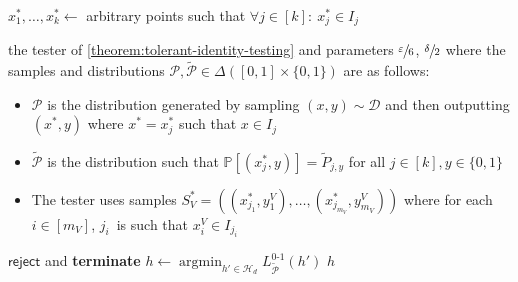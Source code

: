 \documentclass[11pt]{article}
\numberwithin{equation}{section}
\theoremstyle{definition}
\theoremstyle{plain}
\theoremstyle{definition}\newtheorem{notation}[theorem]{Notation}\theoremstyle{plain}\raggedbottom
\newcommand{\roundBrackets}[1]{
	\mathopen{}\left(#1\right)\mathclose{}
}
\newcommand{\squareBrackets}[1]{
	\mathopen{}\left[#1\right]\mathclose{}
}
\newcommand{\customFunctionSquare}[2]{
	#1\squareBrackets{#2}
}
\newcommand{\bbFunction}[2]{
	\customFunctionSquare{\mathbb{#1}}{#2}
}
\newcommand{\vsp}{\vspace{0.5em}}
\newcommand{\vspp}{\vspace{1em}}
\newcommand{\argmin}{\operatorname{argmin}}
\newcommand{\PP}[1]{\bbFunction{P}{#1}}
\newcommand{\LossIndicator}[2]{\LossIndicatorNameEmpty_{#1}\roundBrackets{#2}}
\newcommand{\LossIndicatorNameEmpty}{L^{0\text{-}1}}
\newcommand{\reject}{\mathsf{reject}}
\newcommand{\cD}{\mathcal{D}}
\newcommand{\cH}{\mathcal{H}}
\newcommand{\cP}{\mathcal{P}}
\newcommand{\1}{\mathds{1}}
\newcommand{\mV}{m_{\scriptscriptstyle V}}
\newenvironment{ShadedAlgorithmBox}{\begin{tcolorbox}[colback=myLipicsLightGray,colframe=myLipicsLightGray,arc=-1pt]\begin{minipage}{0.975\textwidth}}{\end{minipage}\end{tcolorbox}}
\begin{document}
\begin{minipage}{\textwidth}
\begin{protocol}[H]
\begin{ShadedAlgorithmBox}
\begin{algorithmic}
			\vsp

			\State $x_1^*,\dots,x_k^* \gets$ arbitrary points such that $\forall j \in [k]: ~ x_j^* \in I_j$

			\vsp

			 the tester of \cref{theorem:tolerant-identity-testing} and parameters $\sfrac{\varepsilon}{6}$, $\sfrac{\delta}{2}$ where the samples and distributions $\cP,\tilde{\cP} \in \Delta([0,1] \times \{0,1\})$ are as follows:
			\vsp
			\begin{itemize}
				\item[-]{
					$\cP$ is the distribution generated by sampling $(x,y) \sim \cD$ and then outputting $(x^*,y)$ where $x^* = x_j^*$ such that $x \in I_j$
				}
				\item[-]{
					$\tilde{\cP}$ is the distribution such that $\PP{(x_j^*,y)} = \tilde{P}_{j,y}$ for all $j \in [k],y \in \{0,1\}$
				}
				\item[-]{
					The tester uses samples $S_V^* = 
					\left(
						(x_{j_1}^*,y_1^V),
						\dots,
						(x_{j_{\mV}}^*,y_{\mV}^V)
					\right)$ 
					where for each $i \in [\mV]$, $j_i$~is such that $x_{i}^V \in I_{j_i}$
				}
			\end{itemize}
			\vspp
				 $\reject$ and {\bfseries terminate} 
			\EndIf
			\vsp
			\State $h \gets \argmin_{h' \in \cH_d} \LossIndicator{\tilde{\cP}}{h'}$
			\vsp
			 $h$  
			
		\end{algorithmic}	
	\end{ShadedAlgorithmBox}
	\caption{Verification protocol for unions of $d$-intervals.}
	\label{protocol:union-of-intervals}
\end{protocol}
\end{minipage}
	
\end{document}
